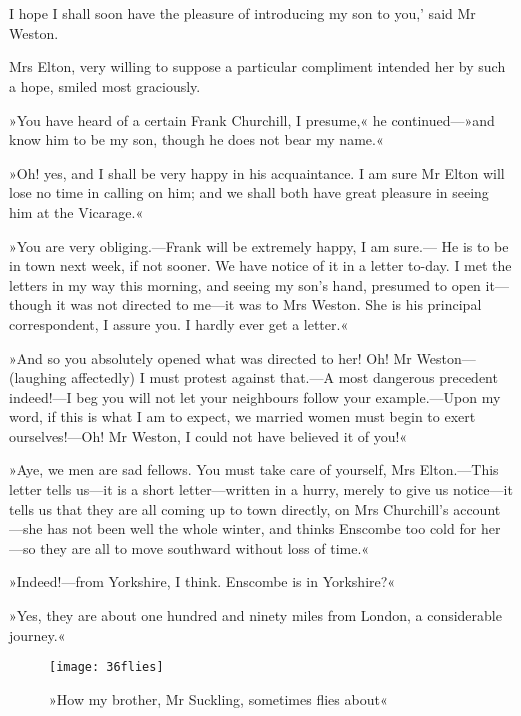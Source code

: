 \chapter[Chapter \thechapter]{}
	
\lettrine[lines=4,lraise=0.3,ante=`]{I}{} hope I shall soon have the pleasure of introducing my son to you,' said Mr Weston.

\zz
Mrs Elton, very willing to suppose a particular compliment intended her by such a hope, smiled most graciously.

»You have heard of a certain Frank Churchill, I presume,« he continued—»and know him to be my son, though he does not bear my name.«

»Oh! yes, and I shall be very happy in his acquaintance. I am sure Mr Elton will lose no time in calling on him; and we shall both have great pleasure in seeing him at the Vicarage.«

»You are very obliging.—Frank will be extremely happy, I am sure.— He is to be in town next week, if not sooner. We have notice of it in a letter to-day. I met the letters in my way this morning, and seeing my son's hand, presumed to open it—though it was not directed to me—it was to Mrs Weston. She is his principal correspondent, I assure you. I hardly ever get a letter.«

»And so you absolutely opened what was directed to her! Oh! Mr Weston—(laughing affectedly) I must protest against that.—A most dangerous precedent indeed!—I beg you will not let your neighbours follow your example.—Upon my word, if this is what I am to expect, we married women must begin to exert ourselves!—Oh! Mr Weston, I could not have believed it of you!«

»Aye, we men are sad fellows. You must take care of yourself, Mrs Elton.—This letter tells us—it is a short letter—written in a hurry, merely to give us notice—it tells us that they are all coming up to town directly, on Mrs Churchill's account—she has not been well the whole winter, and thinks Enscombe too cold for her—so they are all to move southward without loss of time.«

»Indeed!—from Yorkshire, I think. Enscombe is in Yorkshire?«

»Yes, they are about one hundred and ninety miles from London, a considerable journey.«

\begin{figure}[tbph]
\centering
\texttt{[image: 36flies]}
\caption{»How my brother, Mr Suckling, sometimes flies about«}
\end{figure}


